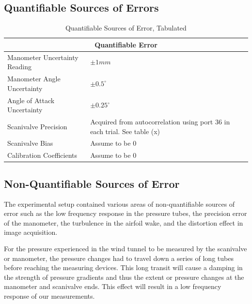 \documentclass[runningheads]{llncs}
\begin{document}
\subsection{Quantifiable Sources of Errors}
\begin{table}[H]
\begin{center}
    \begin{tabular}{ll}
        \toprule
        \multicolumn{2}{c}{Quantifiable Error}\\
        \midrule
        Manometer Uncertainty Reading & $\pm 1 \si{mm}$\\
        Manometer Angle Uncertainty & $\pm 0.5^\circ$ \\
        Angle of Attack Uncertainty & $\pm 0.25^\circ$ \\
        Scanivalve Precision & Acquired from autocorrelation using port 36 in each trial. See table (x)\\
        Scanivalve Bias & Assume to be 0 \\
        Calibration Coefficients & Assume to be 0\\
        \bottomrule
\end{tabular}
\end{center}
\caption{Quantifiable Sources of Error, Tabulated}
\label{tab:quant_error}
\end{table}

\subsection{Non-Quantifiable Sources of Error}
\label{sec:non_quantifiable_sources_of_error}

The experimental setup contained various areas of non-quantifiable sources of error such as the low frequency response in the pressure tubes, the precision error of the manometer, the turbulence in the airfoil wake, and the distortion effect in image acquisition.\newline

\noindent
For the pressure experienced in the wind tunnel to be measured by the scanivalve or manometer, the pressure changes had to travel down a series of long tubes before reaching the measuring devices. This long transit will cause a damping in the strength of pressure gradients and thus the extent or pressure changes at the manometer and scanivalve ends. This effect will result in a low frequency response of our measurements.\newline
\end{document}
